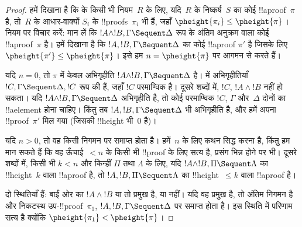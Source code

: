 \documentclass[../../../include/open-logic-section]{subfiles}
\begin{document}
\begin{proof}
हमें दिखाना है कि  के किसी भी नियम~$R$ के लिए, यदि~$R$ के
निष्कर्ष~$S$ का कोई !!a{proof}~$\pi$ है, तो~$R$ के आधार-वाक्यों $S_i$ के
!!{proof}s~$\pi_i$ भी हैं, जहाँ $\pheight{\pi_i} \le \pheight{\pi}$। नियम
\LeftR{\land} पर विचार करें: मान लें कि $!A \land !B, \Gamma \Sequent
\Delta$ रूप के अंतिम अनुक्रम वाला कोई !!a{proof}~$\pi$ है। हमें दिखाना है कि
$!A, !B, \Gamma \Sequent \Delta$ का कोई !!a{proof} $\pi'$ है जिसके लिए
$\pheight{\pi'} \le \pheight{\pi}$। इसे हम $n = \pheight{\pi}$ पर आगमन से
करते हैं।

यदि $n = 0$, तो $\pi$ में केवल अभिगृहीति $!A \land !B, \Gamma \Sequent
\Delta$ है।  में अभिगृहीतियाँ $!C, \Gamma \Sequent \Delta, !C$
रूप की हैं, जहाँ $!C$ परमाण्विक है। दूसरे शब्दों में, $!C$, $!A \land !B$
नहीं हो सकता। यदि $!A \land !B, \Gamma \Sequent \Delta$ अभिगृहीति है, तो
कोई परमाण्विक $!C$, $\Gamma$ और~$\Delta$ दोनों का !!a{element} होना चाहिए।
किंतु तब $!A, !B, \Gamma \Sequent \Delta$ भी अभिगृहीति है, और हमें अपना
!!{proof}~$\pi'$ मिल गया (जिसकी !!{height} भी~$0$ है)।

यदि $n>0$, तो वह किसी निगमन पर समाप्त होता है। हमें~$n$ के लिए कथन सिद्ध
करना है, किंतु हम मान सकते हैं कि वह ऊँचाई~$<n$ के किसी भी !!{proof} के लिए
सत्य है, प्रसंग भिन्न होने पर भी। दूसरे शब्दों में, किसी भी $k<n$ और किन्हीं
$\Pi$ तथा $\Lambda$ के लिए, यदि $!A \land !B, \Pi \Sequent \Lambda$ का
!!{height}~$k$ वाला !!a{proof} है, तो $!A, !B, \Pi \Sequent \Lambda$ का
!!{height}~$\le k$ वाला !!a{proof} है।

दो स्थितियाँ हैं: बाईं ओर का $!A \land !B$ या तो प्रमुख है, या नहीं। यदि वह
प्रमुख है, तो अंतिम निगमन \LeftR{\land} है और निकटस्थ उप-!!{proof}~$\pi_1$,
$!A, !B, \Gamma \Sequent \Delta$ पर समाप्त होता है। इस स्थिति में परिणाम
सत्य है क्योंकि $\pheight{\pi_1} < \pheight{\pi}$।


\end{proof}
\end{document}
